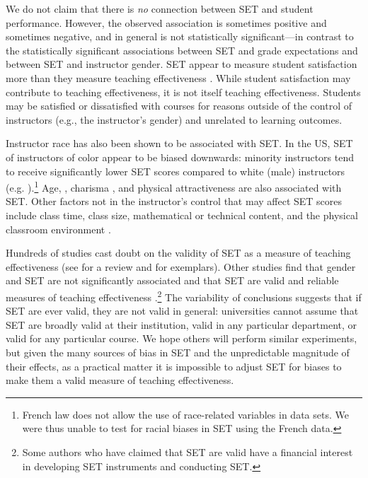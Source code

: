 \documentclass[12pt]{article}
\begin{document}
We do not claim that there is \emph{no} connection between SET and student
performance.
However, the observed association is sometimes positive and sometimes
negative, and in general is not statistically significant---in contrast to
the statistically significant associations between SET and grade expectations and 
between SET and instructor gender.
SET appear to measure student 
satisfaction more than they measure teaching effectiveness \citep{StarkFreishtat2014}. 
While student satisfaction may contribute to teaching effectiveness, it is not itself teaching effectiveness.
Students may be satisfied or dissatisfied with courses for reasons outside of the control of instructors
(e.g., the instructor's gender) and unrelated to learning outcomes.

Instructor race has also been shown to be associated with SET.  
In the US, SET of instructors of color appear to be biased downwards:
minority instructors tend to receive significantly lower SET scores compared to white (male) 
instructors (e.g. \citet{Merritt2008}).\footnote{%
  French law does not allow the use of race-related variables in data sets. 
  We were thus unable to test for racial biases in SET using the French data.
} 
Age,
\citep{Arbuckle2003}, charisma \citep{Shevlin2000}, and physical attractiveness 
\citep{Riniolo2006,Hamermesh2005} are also associated with SET.
Other factors not in the instructor's control that may affect SET scores include
class time, class size, mathematical or technical content, and the 
physical classroom environment \citep{Hill2010}.

Hundreds of studies cast doubt on the validity of SET as a measure of teaching effectiveness 
(see \citet{Pounder2007} for a review and \citet{Galbraith2012,Carrell2010a} for exemplars). 
Other studies find that gender and SET are not significantly associated and that SET are valid and reliable measures of teaching effectiveness \citep{Benton2012,Centra1977}.\footnote{%
  Some authors who have claimed that SET are valid have a financial interest in 
  developing SET instruments and conducting SET.
} 
The variability of conclusions suggests that if SET are ever valid, they
are not valid in general: universities cannot assume that SET are broadly valid at their
institution, valid in any particular department, or valid for any particular course. 
We hope others will perform similar experiments, but given the many sources of bias in 
SET and the unpredictable magnitude of their effects, as a practical matter it is impossible to adjust
SET for biases to make them a valid measure of teaching effectiveness. 
\end{document}
